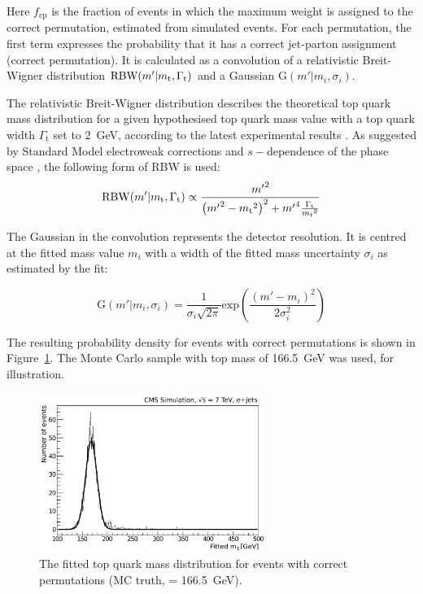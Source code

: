 Here $f_{\textrm{cp}}$ is the fraction of events in which the maximum weight is assigned to the correct permutation,
estimated from simulated \ttbar events. For each permutation, the first term expresses the probability that it has a
correct jet-parton assignment (correct permutation). It is calculated as a convolution of a relativistic Breit-Wigner
distribution $\textrm{RBW}(m'|m_\mathrm{t},\Gamma_{\textrm{t}})$ and a Gaussian $\textrm{G}(m'|m_{i},\sigma_{i})$.

The relativistic Breit-Wigner distribution describes the theoretical top quark mass distribution for a given
hypothesised top quark mass value \mtop with a top quark width $\Gamma_{\textrm{t}}$ set to \SI{2}{\GeV}, according to
the latest experimental results \autocite{top_width_D0}. As suggested by Standard Model electroweak corrections and
$s-$dependence of the phase space \cite{aleph_Z_RBW}, the following form of RBW is used:
\begin{equation}
\textrm{RBW}(m'|m_\mathrm{t},\Gamma_{\textrm{t}}) \propto \frac{{m'}^{2}}{\left({m'}^{2} - {m_\mathrm{t}}^{2}
\right)^{2} + {m'}^{4}\frac{\Gamma_{\textrm{t}}}{{m_\mathrm{t}}^{2}}}
\end{equation}

The Gaussian in the convolution represents the detector resolution. It is centred at the fitted mass value $m_{i}$ with
a width of the fitted mass uncertainty $\sigma_{i}$ as estimated by the fit:

\begin{equation}
\textrm{G}(m'|m_{i},\sigma_{i}) = \frac{1}{\sigma_{i}\sqrt{2\pi}}
\textrm{exp}\left(\frac{(m'-m_{i})^{2}}{2\sigma_{i}^2}\right)
\end{equation}

The resulting probability density for \ttbar events with correct permutations is shown in
Figure~\ref{fig:fitted_ttbar_cp_density}. The Monte Carlo sample with top mass of \SI{166.5}{\GeV} was used, for
illustration.

\begin{figure}[!htpb]
	\centering
    \includegraphics[width=0.65\textwidth]{correct_permutations_fitted_top_mass}
	\caption{\label{fig:fitted_ttbar_cp_density}
	The fitted top quark mass distribution for \ttbar events with correct permutations (MC truth, \mtop =
	\SI{166.5}{\GeV}).}
\end{figure}

